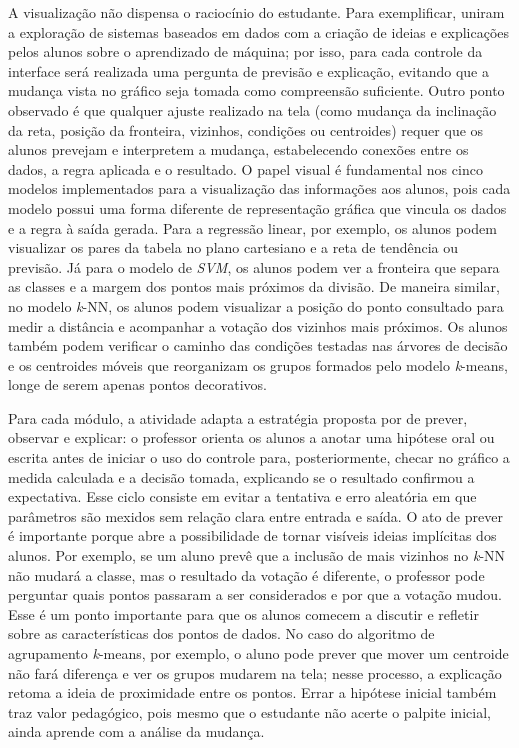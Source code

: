 A visualização não dispensa o raciocínio do estudante. Para exemplificar,  uniram a exploração de sistemas baseados em dados com a criação de ideias e explicações pelos alunos sobre o aprendizado de máquina; por isso, para cada controle da interface será realizada uma pergunta de previsão e explicação, evitando que a mudança vista no gráfico seja tomada como compreensão suficiente. Outro ponto observado é que qualquer ajuste realizado na tela (como mudança da inclinação da reta, posição da fronteira, vizinhos, condições ou centroides) requer que os alunos prevejam e interpretem a mudança, estabelecendo conexões entre os dados, a regra aplicada e o resultado. O papel visual é fundamental nos cinco modelos implementados para a visualização das informações aos alunos, pois cada modelo possui uma forma diferente de representação gráfica que vincula os dados e a regra à saída gerada. Para a regressão linear, por exemplo, os alunos podem visualizar os pares da tabela no plano cartesiano e a reta de tendência ou previsão. Já para o modelo de \textit{SVM}, os alunos podem ver a fronteira que separa as classes e a margem dos pontos mais próximos da divisão. De maneira similar, no modelo \textit{k}-NN, os alunos podem visualizar a posição do ponto consultado para medir a distância e acompanhar a votação dos vizinhos mais próximos. Os alunos também podem verificar o caminho das condições testadas nas árvores de decisão e os centroides móveis que reorganizam os grupos formados pelo modelo \textit{k}-means, longe de serem apenas pontos decorativos.

Para cada módulo, a atividade adapta a estratégia proposta por  de prever, observar e explicar: o professor orienta os alunos a anotar uma hipótese oral ou escrita antes de iniciar o uso do controle para, posteriormente, checar no gráfico a medida calculada e a decisão tomada, explicando se o resultado confirmou a expectativa. Esse ciclo consiste em evitar a tentativa e erro aleatória em que parâmetros são mexidos sem relação clara entre entrada e saída. O ato de prever é importante porque abre a possibilidade de tornar visíveis ideias implícitas dos alunos. Por exemplo, se um aluno prevê que a inclusão de mais vizinhos no \textit{k}-NN não mudará a classe, mas o resultado da votação é diferente, o professor pode perguntar quais pontos passaram a ser considerados e por que a votação mudou. Esse é um ponto importante para que os alunos comecem a discutir e refletir sobre as características dos pontos de dados. No caso do algoritmo de agrupamento \textit{k}-means, por exemplo, o aluno pode prever que mover um centroide não fará diferença e ver os grupos mudarem na tela; nesse processo, a explicação retoma a ideia de proximidade entre os pontos. Errar a hipótese inicial também traz valor pedagógico, pois mesmo que o estudante não acerte o palpite inicial, ainda aprende com a análise da mudança.

